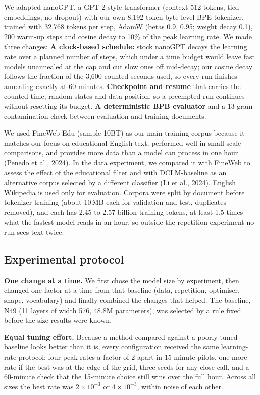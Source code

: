 \documentclass[11pt,a4paper]{article}
\begin{document}
We adapted nanoGPT, a GPT-2-style transformer (context 512 tokens, tied embeddings, no dropout) with our own 8,192-token byte-level BPE tokenizer, trained with 32,768 tokens per step, AdamW (betas 0.9, 0.95; weight decay 0.1), 200 warm-up steps and cosine decay to 10\% of the peak learning rate. We made three changes: \textbf{A clock-based schedule:} stock nanoGPT decays the learning rate over a planned number of steps, which under a time budget would leave fast models unannealed at the cap and cut slow ones off mid-decay; our cosine decay follows the fraction of the 3,600 counted seconds used, so every run finishes annealing exactly at 60 minutes. \textbf{Checkpoint and resume} that carries the counted time, random states and data position, so a preempted run continues without resetting its budget. \textbf{A deterministic BPB evaluator} and a 13-gram contamination check between evaluation and training documents.

We used FineWeb-Edu (sample-10BT) as our main training corpus because it matches our focus on educational English text, performed well in small-scale comparisons, and provides more data than a model can process in one hour (Penedo et al., 2024). In the data experiment, we compared it with FineWeb to assess the effect of the educational filter and with DCLM-baseline as an alternative corpus selected by a different classifier (Li et al., 2024). English Wikipedia is used only for evaluation. Corpora were split by document before tokenizer training (about 10\,MB each for validation and test, duplicates removed), and each has 2.45 to 2.57 billion training tokens, at least 1.5 times what the fastest model reads in an hour, so outside the repetition experiment no run sees text twice.

\subsection{Experimental protocol}\label{sec:protocol}

\textbf{One change at a time.} We first chose the model size by experiment, then changed one factor at a time from that baseline (data, repetition, optimiser, shape, vocabulary) and finally combined the changes that helped. The baseline, N49 (11 layers of width 576, 48.8M parameters), was selected by a rule fixed before the size results were known.

\textbf{Equal tuning effort.} Because a method compared against a poorly tuned baseline looks better than it is, every configuration received the same learning-rate protocol: four peak rates a factor of 2 apart in 15-minute pilots, one more rate if the best was at the edge of the grid, three seeds for any close call, and a 60-minute check that the 15-minute choice still wins over the full hour. Across all sizes the best rate was $2\times10^{-3}$ or $4\times10^{-3}$, within noise of each other.
\end{document}
